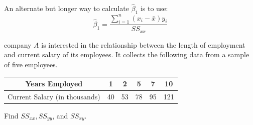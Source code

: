 \begin{nt}
An alternate but longer way to calculate $\hat{\beta}_{1}$ is to use:
	\begin{equation}
	\hat{\beta}_{1} = \frac{ \displaystyle\sum_{i=1}^{n} (x_{i} - \bar{x}) y_{i} }{ SS_{xx} }
	\end{equation}
\end{nt}

\begin{example}
\label{firstExampleReg}
company $A$ is interested in the relationship between the length of employment and current salary of its employees. It collects the following data from a sample of five employees.

\begin{center}
\def\arraystretch{1.5}
\begin{tabular}{c|c|c|c|c|c}

Years Employed & 1 & 2 & 5 & 7 & 10 \\ 
\hline 
Current Salary (in thousands) & 40 & 53 & 78 & 95 & 121
\end{tabular} 
\end{center}

\begin{benumerate}
\item Find $SS_{xx}, SS_{yy}$, and $SS_{xy}$.


\end{benumerate}
\end{example}
